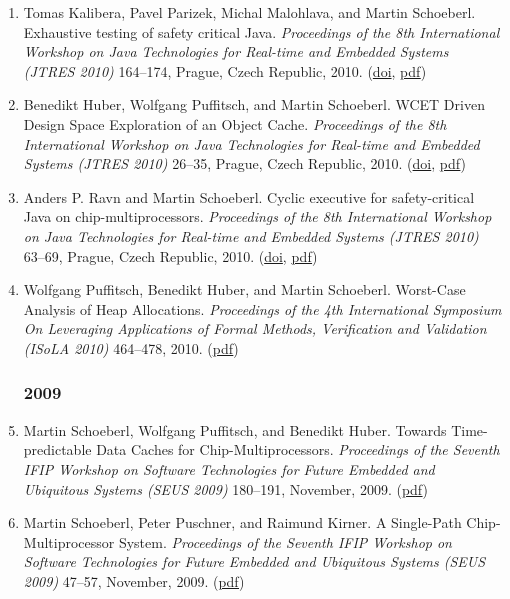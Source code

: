\begin{enumerate}
\item Tomas Kalibera, Pavel Parizek, Michal Malohlava, and Martin Schoeberl.
 Exhaustive testing of safety critical Java.
 \emph{Proceedings of the 8th International Workshop on Java Technologies for Real-time and Embedded Systems (JTRES 2010)} 164--174, Prague, Czech Republic, 2010.
(\href{http://dx.doi.org/10.1145/1850771.1850794}{doi}, \href{http://www.jopdesign.com/doc/jpfscj.pdf}{pdf})

\item Benedikt Huber, Wolfgang Puffitsch, and Martin Schoeberl.
 WCET Driven Design Space Exploration of an Object Cache.
 \emph{Proceedings of the 8th International Workshop on Java Technologies for Real-time and Embedded Systems (JTRES 2010)} 26--35, Prague, Czech Republic, 2010.
(\href{http://dx.doi.org/10.1145/1850771.1850775}{doi}, \href{http://www.jopdesign.com/doc/ocwcet.pdf}{pdf})

\item Anders P. Ravn and Martin Schoeberl.
 Cyclic executive for safety-critical Java on chip-multiprocessors.
 \emph{Proceedings of the 8th International Workshop on Java Technologies for Real-time and Embedded Systems (JTRES 2010)} 63--69, Prague, Czech Republic, 2010.
(\href{http://dx.doi.org/10.1145/1850771.1850779}{doi}, \href{http://www.jopdesign.com/doc/cmpce.pdf}{pdf})

\item Wolfgang Puffitsch, Benedikt Huber, and Martin Schoeberl.
 Worst-Case Analysis of Heap Allocations.
 \emph{Proceedings of the 4th International Symposium On Leveraging Applications of Formal Methods, Verification and Validation (ISoLA 2010)} 464--478, 2010.
(\href{http://www.jopdesign.com/doc/wcmem.pdf}{pdf})


\subsubsection*{2009}

\item Martin Schoeberl, Wolfgang Puffitsch, and Benedikt Huber.
 Towards Time-predictable Data Caches for Chip-Multiprocessors.
 \emph{Proceedings of the Seventh IFIP Workshop on Software Technologies for Future Embedded and Ubiquitous Systems (SEUS 2009)} 180--191, November, 2009.
(\href{http://www.jopdesign.com/doc/dcache_seus.pdf}{pdf})

\item Martin Schoeberl, Peter Puschner, and Raimund Kirner.
 A Single-Path Chip-Multiprocessor System.
 \emph{Proceedings of the Seventh IFIP Workshop on Software Technologies for Future Embedded and Ubiquitous Systems (SEUS 2009)} 47--57, November, 2009.
(\href{http://www.jopdesign.com/doc/spcmp_seus.pdf}{pdf})


\end{enumerate}
